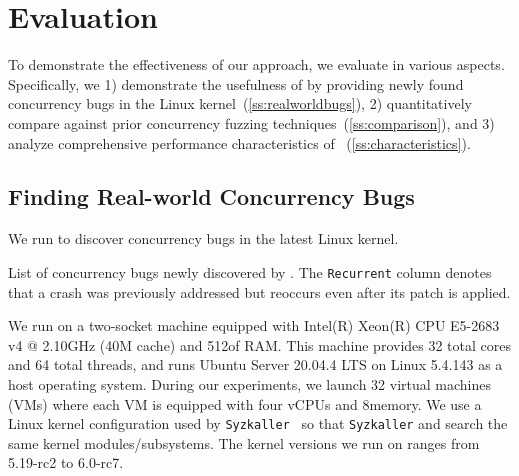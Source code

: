 \section{Evaluation}
\label{s:eval}

To demonstrate the effectiveness of our approach, 
we evaluate \sys in various aspects.
%
Specifically, we 1) demonstrate the usefulness of \sys by providing
newly found concurrency bugs in the Linux
kernel~(\autoref{ss:realworldbugs}),
%
2) quantitatively compare \sys against prior concurrency fuzzing
techniques~(\autoref{ss:comparison}), and
%
3) analyze comprehensive performance characteristics of
\sys~(\autoref{ss:characteristics}).
%

\subsection{Finding Real-world Concurrency Bugs}
\label{ss:realworldbugs}

We run \sys to discover concurrency bugs in the latest Linux kernel.

\begin{table}[t]
  \centering
  
  \caption{List of concurrency bugs newly discovered by \sys. The
    \texttt{Recurrent} column denotes that a crash was previously
    addressed but reoccurs even after its patch is applied.}
  \label{table:newbugs}
  \vspace{-5pt}
\end{table}

%
We run \sys on a two-socket machine equipped with
Intel(R) Xeon(R) CPU E5-2683 v4 @ 2.10GHz (40M cache) and 512\GB of
RAM.
%
This machine provides 32 total cores and 64 total threads, and runs
Ubuntu Server 20.04.4 LTS on Linux 5.4.143 as a host operating system.
%
During our experiments, we launch 32 virtual machines (VMs) where each
VM is equipped with four vCPUs and 8\GB memory.
%
We use a Linux kernel configuration used by
\texttt{Syzkaller}~\cite{syzkaller} so that \texttt{Syzkaller} and
\sys search the same kernel modules/subsystems.
The kernel versions we run on \sys ranges from 5.19-rc2 to 6.0-rc7.
%


